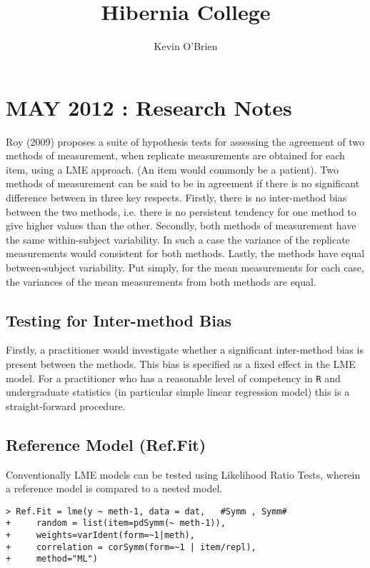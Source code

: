 \documentclass[12pt]{article} %
\title{Hibernia College}
\author{Kevin O'Brien}
\begin{document}
\maketitle
\tableofcontents
\newpage
\section{MAY 2012 : Research Notes}
Roy (2009) proposes a suite of hypothesis tests for assessing the agreement of two methods of measurement, when replicate measurements are obtained for each item, using a LME approach. (An item would commonly be a patient).  Two methods of measurement can be said to be in agreement if there is no significant difference between in three key respects. Firstly, there is no inter-method bias between the two methods, i.e. there is no persistent tendency for one method to give higher values than the other.
Secondly, both methods of measurement have the same  within-subject variability. In such a case the variance of the replicate measurements would consistent for both methods.
Lastly, the methods have equal between-subject variability.  Put simply, for the mean measurements for each case, the variances of the mean measurements from both methods are equal.
\subsection{Testing for Inter-method Bias}
Firstly, a practitioner would investigate whether a significant inter-method bias is present between the methods. This bias is specified as a fixed effect in the LME model.  For a practitioner who has a reasonable level of competency in \texttt{R} and undergraduate statistics (in particular simple linear regression model) this is a straight-forward procedure.
\subsection{Reference Model (Ref.Fit)}
Conventionally LME models can be tested using Likelihood Ratio Tests, wherein a reference model is compared to a nested model.
\begin{framed}
\begin{verbatim}
> Ref.Fit = lme(y ~ meth-1, data = dat,   #Symm , Symm#
+     random = list(item=pdSymm(~ meth-1)), 
+     weights=varIdent(form=~1|meth),
+     correlation = corSymm(form=~1 | item/repl), 
+     method="ML")
\end{verbatim}
\end{framed}
\end{document}
